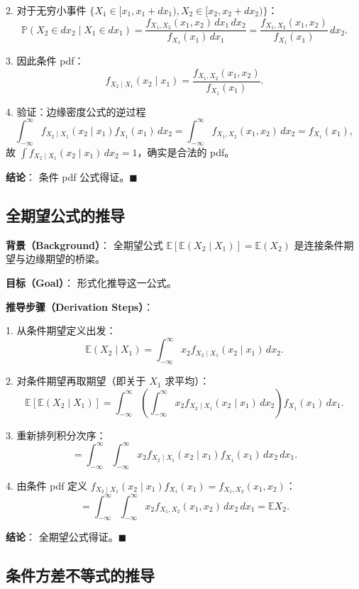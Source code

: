 2. 对于无穷小事件 $\{X_1 \in [x_1, x_1 + dx_1), X_2 \in [x_2, x_2 + dx_2)\}$：
\[
\mathbb{P}(X_2 \in dx_2 \mid X_1 \in dx_1) = \frac{f_{X_1, X_2}(x_1, x_2) \, dx_1 \, dx_2}{f_{X_1}(x_1) \, dx_1} = \frac{f_{X_1, X_2}(x_1, x_2)}{f_{X_1}(x_1)} \, dx_2.
\]

3. 因此条件 pdf：
\[
f_{X_2 \mid X_1}(x_2 \mid x_1) = \frac{f_{X_1, X_2}(x_1, x_2)}{f_{X_1}(x_1)}.
\]

4. 验证：边缘密度公式的逆过程
\[
\int_{-\infty}^{\infty} f_{X_2 \mid X_1}(x_2 \mid x_1) f_{X_1}(x_1) \, dx_2 = \int_{-\infty}^{\infty} f_{X_1, X_2}(x_1, x_2) \, dx_2 = f_{X_1}(x_1),
\]
故 $\int f_{X_2 \mid X_1}(x_2 \mid x_1) \, dx_2 = 1$，确实是合法的 pdf。

\textbf{结论}：
条件 pdf 公式得证。$\blacksquare$

\subsection{全期望公式的推导}\label{sec:derivation-law-total-expectation}

\textbf{背景（Background）}：
全期望公式 $\mathbb{E}[\mathbb{E}(X_2 \mid X_1)] = \mathbb{E}(X_2)$ 是连接条件期望与边缘期望的桥梁。

\textbf{目标（Goal）}：
形式化推导这一公式。

\textbf{推导步骤（Derivation Steps）}：

1. 从条件期望定义出发：
\[
\mathbb{E}(X_2 \mid X_1) = \int_{-\infty}^{\infty} x_2 f_{X_2 \mid X_1}(x_2 \mid x_1) \, dx_2.
\]

2. 对条件期望再取期望（即关于 $X_1$ 求平均）：
\[
\mathbb{E}[\mathbb{E}(X_2 \mid X_1)] = \int_{-\infty}^{\infty} \left( \int_{-\infty}^{\infty} x_2 f_{X_2 \mid X_1}(x_2 \mid x_1) \, dx_2 \right) f_{X_1}(x_1) \, dx_1.
\]

3. 重新排列积分次序：
\[
= \int_{-\infty}^{\infty} \int_{-\infty}^{\infty} x_2 f_{X_2 \mid X_1}(x_2 \mid x_1) f_{X_1}(x_1) \, dx_2 \, dx_1.
\]

4. 由条件 pdf 定义 $f_{X_2 \mid X_1}(x_2 \mid x_1) f_{X_1}(x_1) = f_{X_1, X_2}(x_1, x_2)$：
\[
= \int_{-\infty}^{\infty} \int_{-\infty}^{\infty} x_2 f_{X_1, X_2}(x_1, x_2) \, dx_2 \, dx_1 = \mathbb{E}X_2.
\]

\textbf{结论}：
全期望公式得证。$\blacksquare$

\subsection{条件方差不等式的推导}\label{sec:derivation-variance-inequality}


